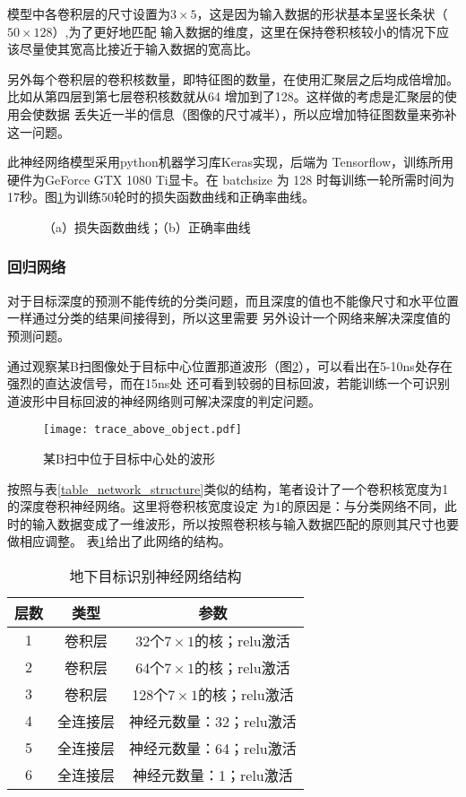 模型中各卷积层的尺寸设置为$3\times 5$，这是因为输入数据的形状基本呈竖长条状（$50\times 128$）,为了更好地匹配
输入数据的维度，这里在保持卷积核较小的情况下应该尽量使其宽高比接近于输入数据的宽高比。

另外每个卷积层的卷积核数量，即特征图的数量，在使用汇聚层之后均成倍增加。比如从第四层到第七层卷积核数就从64
增加到了128。这样做的考虑是汇聚层的使用会使数据
丢失近一半的信息（图像的尺寸减半），所以应增加特征图数量来弥补这一问题。

此神经网络模型采用python机器学习库Keras实现，后端为 Tensorflow，训练所用硬件为GeForce GTX 1080 Ti显卡。在
batchsize 为 128 时每训练一轮所需时间为17秒。图\ref{loss_acc_curve}为训练50轮时的损失函数曲线和正确率曲线。
\begin{figure}[htbp]
	\caption{（a）损失函数曲线；（b）正确率曲线}
	\label{loss_acc_curve}
\end{figure}
\subsubsection{回归网络}
对于目标深度的预测不能传统的分类问题，而且深度的值也不能像尺寸和水平位置一样通过分类的结果间接得到，所以这里需要
另外设计一个网络来解决深度值的预测问题。

通过观察某B扫图像处于目标中心位置那道波形（图\ref{trace_above_object}），可以看出在5-10ns处存在强烈的直达波信号，而在15ns处
还可看到较弱的目标回波，若能训练一个可识别道波形中目标回波的神经网络则可解决深度的判定问题。
\begin{figure}[htbp]
	\texttt{[image: trace\_above\_object.pdf]}
	\caption{某B扫中位于目标中心处的波形}
	\label{trace_above_object}
\end{figure}

按照与表\ref{table_network_structure}类似的结构，笔者设计了一个卷积核宽度为1的深度卷积神经网络。这里将卷积核宽度设定
为1的原因是：与分类网络不同，此时的输入数据变成了一维波形，所以按照卷积核与输入数据匹配的原则其尺寸也要做相应调整。
表\ref{table_regression_structure}给出了此网络的结构。
\begin{table}[h]
	\caption{地下目标识别神经网络结构} 
	\begin{tabular}{|c|c|c|} 
		\hline  
		层数 &  类型 & 参数\\
		\hline 
		1 & 卷积层 & 32个$7\times 1$的核；relu激活\\  
		\hline
		2 & 卷积层 & 64个$7\times 1$的核；relu激活\\  
		\hline
		3 & 卷积层 & 128个$7\times 1$的核；relu激活\\
		\hline
		4 & 全连接层 & 神经元数量：32；relu激活\\
		\hline
		5 & 全连接层 & 神经元数量：64；relu激活\\
		\hline
		6 & 全连接层 & 神经元数量：1；relu激活\\
		\hline  
	\end{tabular}
	\label{table_regression_structure}
\end{table}

